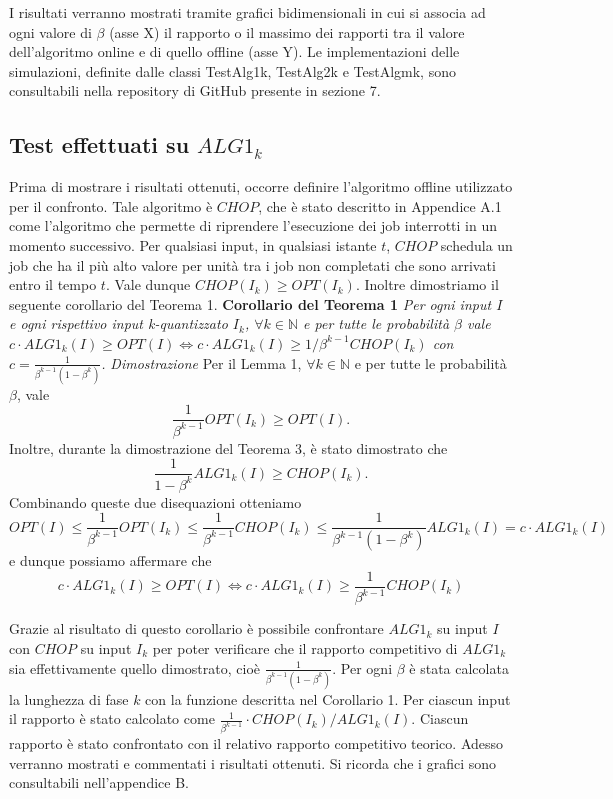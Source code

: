 \documentclass[12pt]{article}
\newcommand*{\N}{\mathbb{N}}
\begin{document}
I risultati verranno mostrati tramite grafici bidimensionali in cui si associa ad ogni valore di $\beta$ (asse X) il rapporto o il massimo dei rapporti tra il valore dell'algoritmo online e di quello offline (asse Y). Le implementazioni delle simulazioni, definite dalle classi TestAlg1k, TestAlg2k e TestAlgmk, sono consultabili nella repository di GitHub presente in sezione 7.

\subsection{Test effettuati su $ALG1_{k}$}
Prima di mostrare i risultati ottenuti, occorre definire l’algoritmo offline utilizzato per il confronto. Tale algoritmo è $CHOP$, che è stato descritto in Appendice A.1 come l’algoritmo che permette di riprendere l’esecuzione dei job interrotti in un momento successivo. Per qualsiasi input, in qualsiasi istante $t$, $CHOP$ schedula un job che ha il più alto valore per unità tra i job non completati che sono arrivati entro il tempo $t$. Vale dunque $CHOP(I_{k}) \geq OPT(I_{k})$. Inoltre dimostriamo il seguente corollario del Teorema 1.
\newline \newline
\textbf{Corollario del Teorema 1}
\textit{Per ogni input $I$ e ogni rispettivo input k-quantizzato $I_{k}$, $\forall k \in \N$ e per tutte le probabilità $\beta$ vale
$c \cdot ALG1_{k}(I) \geq OPT(I) \iff c \cdot ALG1_{k}(I) \geq 1/\beta^{k-1} CHOP(I_{k})$
 con $c = \frac{1}{\beta^{k-1}(1 - \beta^{k})}$.}
\newline \newline
\textit{Dimostrazione} 
Per il Lemma 1, $\forall k \in \N$ e per tutte le probabilità $\beta$, vale $$\frac{1}{\beta^{k-1}} OPT(I_{k}) \geq OPT(I).$$
Inoltre, durante la dimostrazione del Teorema 3, è stato dimostrato che $$\frac{1}{1 - \beta^{k}} ALG1_{k}(I) \geq CHOP(I_{k}).$$
Combinando queste due disequazioni otteniamo
$$OPT(I) \leq \frac{1}{\beta^{k-1}} OPT(I_{k}) \leq \frac{1}{\beta^{k-1}} CHOP(I_{k}) \leq \frac{1}{\beta^{k-1}(1 - \beta^{k})} ALG1_{k}(I) = c \cdot ALG1_{k}(I)$$
e dunque possiamo affermare che
\begin{equation}
c \cdot ALG1_{k}(I) \geq OPT(I) \iff c \cdot ALG1_{k}(I) \geq \frac{1}{\beta^{k-1}} CHOP(I_{k}) \tag*{$\square$}
\end{equation}

Grazie al risultato di questo corollario è possibile confrontare $ALG1_{k}$ su input $I$ con $CHOP$ su input $I_{k}$ per poter verificare che il rapporto competitivo di $ALG1_{k}$ sia effettivamente quello dimostrato, cioè $\frac{1}{\beta^{k-1}(1 - \beta^{k})}$. Per ogni $\beta$ è stata calcolata la lunghezza di fase $k$ con la funzione descritta nel Corollario 1. Per ciascun input il rapporto è stato calcolato come $\frac{1}{\beta^{k-1}} \cdot CHOP(I_{k}) / ALG1_{k}(I)$. Ciascun rapporto è stato confrontato con il relativo rapporto competitivo teorico. Adesso verranno mostrati e commentati i risultati ottenuti. Si ricorda che i grafici sono consultabili nell'appendice B.
\end{document}
